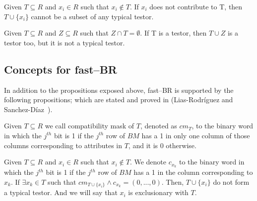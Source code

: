 \documentclass[citeauthoryear]{llncs}
\begin{document}
	\begin{proposition}\label{prop:contrib} 
		Given $T \subseteq R$ and  $x_i \in R$ such that $x_i \notin T$. If $x_i$ does not contribute to T, then 		$T\cup\{x_i\}$ cannot be a subset of any typical testor.
	\end{proposition}

	\begin{proposition}\label{prop:superset} 
		Given $T \subseteq R$ and $Z \subseteq R$ such that $Z \cap T = \emptyset$. If T is a testor, then $T \cup Z$ is a 	testor too, but it is not a typical testor.
	\end{proposition}

%
\subsection{Concepts for fast--BR}
%
	In addition to the propositions exposed above, fast--BR is supported by the following propositions; which are stated and proved in (Lias-Rodr\'iguez and Sanchez-D\'iaz~\cite{Lias2013}).

%	
	
	\begin{definition}\label{def:exclusion}
		Given $T \subseteq R$ we call compatibility mask of $T$, denoted as $cm_T$, to the binary word in which the $j^{\mathit{th}}$ bit is 1 if the $j^{\mathit{th}}$ row of $BM$ has a 1 in only one column of those columns corresponding to attributes in $T$, and it is 0 otherwise.
	\end{definition}
	
	\begin{proposition}\label{prop:exclude} 
		Given $T \subseteq R$ and $x_i \in R$ such that $x_i \notin T$.	We denote $c_{x_k}$ to the binary word in which the $j^{\mathit{th}}$ bit is 1 if the $j^{\mathit{th}}$ row of $BM$ has a 1 in the column corresponding to $x_k$. If $\exists x_k \in T$ such that $cm_{T \cup \lbrace x_i\rbrace} \wedge c_{x_k}=(0,...,0)$. Then, $T \cup \lbrace x_i\rbrace$ do not form a typical testor. And we will say that $x_i$ is exclusionary with $T$.
	\end{proposition}
	
\end{document}

